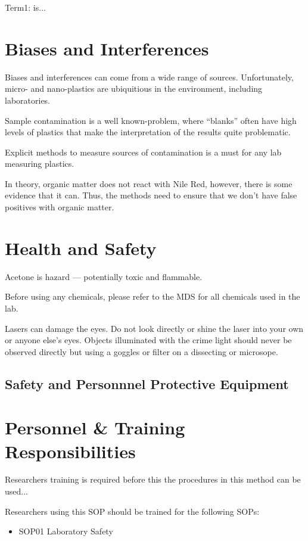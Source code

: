 \documentclass[12pt]{../SOP4_alpha}\usepackage[]{graphicx}\usepackage[]{color}
\begin{document}
\NP Term1: is...

\section{Biases and Interferences}

\NP Biases and interferences can come from a wide range of sources. Unfortunately, micro- and nano-plastics are ubiquitious in the environment, including laboratories.

\NP Sample contamination is a well known-problem, where ``blanks'' often have high levels of plastics that make the interpretation of the results quite problematic. 

\NP Explicit methods to measure sources of contamination is a must for any lab measuring plastics. 

\NP In theory, organic matter does not react with Nile Red, however, there is some evidence that it can. Thus, the methods need to ensure that we don't have false positives with organic matter. 

\section{Health and Safety}

\NP Acetone is hazard --- potentially toxic and flammable. 

\NP Before using any chemicals, please refer to the MDS for all chemicals used in the lab. 

\NP Lasers can damage the eyes. Do not look directly or shine the laser into your own or anyone else's eyes. Objects illuminated with the crime light should never be observed directly but using a goggles or filter on a dissecting or microsope. 

\subsection{Safety and Personnnel Protective Equipment}

\section{Personnel \& Training Responsibilities}

\NP Researchers training is required before this the procedures in this method can be used... 

\NP Researchers using this SOP should be trained for the following SOPs:

\begin{itemize}
  \item SOP01 Laboratory Safety
\end{itemize}
\end{document}
